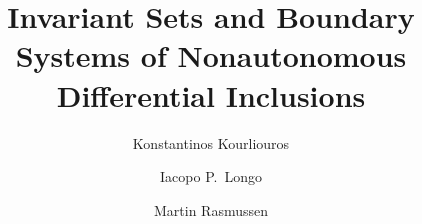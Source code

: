 \documentclass[reqno]{amsart}
\theoremstyle{definition}
\numberwithin{equation}{section}
\begin{document}
\title[Invariant Sets of  Differential Inclusions -- Boundary Systems]{Invariant Sets and Boundary Systems of Nonautonomous Differential Inclusions}

\author[K.~Kourliouros]{Konstantinos Kourliouros}
\author[I.P.~Longo]{Iacopo P.~Longo}
\author[M.~Rasmussen]{Martin Rasmussen}
\address[K.~Kourliouros]{Imperial College London,
Department of Mathematics, 635 Huxley Building, 180 Queen’s Gate
South Kensington Campus, SW7 2AZ London, United Kingdom.}
\address[I.P.~Longo]{University of Exeter,
Department of Mathematics and Statistics, 925 Laver Building, 23 N Park Road, EX4 4QE Exeter, United Kingdom.}
\address[M.~Rasmussen]{Imperial College London,
Department of Mathematics, 637 Huxley Building, 180 Queen’s Gate
South Kensington Campus, SW7 2AZ London, United Kingdom.}

\end{document}
